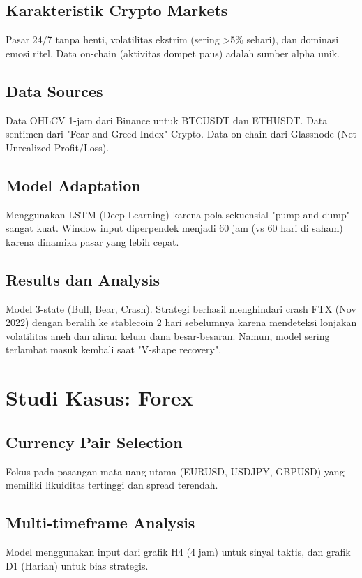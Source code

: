 \documentclass[12pt,a4paper]{book}
\begin{document}
\section{Karakteristik Crypto Markets}
Pasar 24/7 tanpa henti, volatilitas ekstrim (sering >5\% sehari), dan dominasi emosi ritel. Data on-chain (aktivitas dompet paus) adalah sumber alpha unik.

\section{Data Sources}
Data OHLCV 1-jam dari Binance untuk BTCUSDT dan ETHUSDT. Data sentimen dari "Fear and Greed Index" Crypto. Data on-chain dari Glassnode (Net Unrealized Profit/Loss).

\section{Model Adaptation}
Menggunakan LSTM (Deep Learning) karena pola sekuensial "pump and dump" sangat kuat. Window input diperpendek menjadi 60 jam (vs 60 hari di saham) karena dinamika pasar yang lebih cepat.

\section{Results dan Analysis}
Model 3-state (Bull, Bear, Crash). Strategi berhasil menghindari crash FTX (Nov 2022) dengan beralih ke stablecoin 2 hari sebelumnya karena mendeteksi lonjakan volatilitas aneh dan aliran keluar dana besar-besaran. Namun, model sering terlambat masuk kembali saat "V-shape recovery".

\chapter{Studi Kasus: Forex}
\section{Currency Pair Selection}
Fokus pada pasangan mata uang utama (EURUSD, USDJPY, GBPUSD) yang memiliki likuiditas tertinggi dan spread terendah.

\section{Multi-timeframe Analysis}
Model menggunakan input dari grafik H4 (4 jam) untuk sinyal taktis, dan grafik D1 (Harian) untuk bias strategis.
\end{document}
